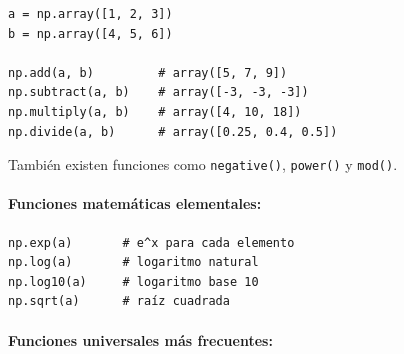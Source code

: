 \documentclass{article}
\theoremstyle{nonumberplain}
\begin{document}
\begin{verbatim}
a = np.array([1, 2, 3])
b = np.array([4, 5, 6])

np.add(a, b)         # array([5, 7, 9])
np.subtract(a, b)    # array([-3, -3, -3])
np.multiply(a, b)    # array([4, 10, 18])
np.divide(a, b)      # array([0.25, 0.4, 0.5])
\end{verbatim}

También existen funciones como \texttt{negative()}, \texttt{power()} y \texttt{mod()}.

\paragraph{Funciones matemáticas elementales:}

\begin{verbatim}
np.exp(a)       # e^x para cada elemento
np.log(a)       # logaritmo natural
np.log10(a)     # logaritmo base 10
np.sqrt(a)      # raíz cuadrada
\end{verbatim}

\paragraph{Funciones universales más frecuentes:}
\end{document}
